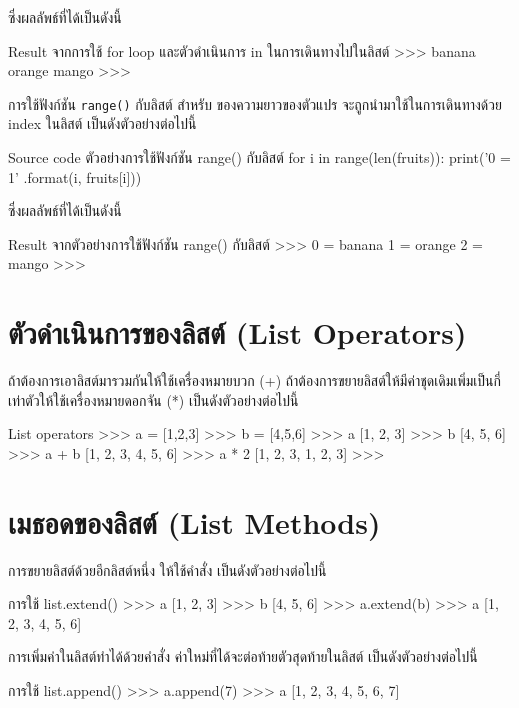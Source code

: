 ซึ่งผลลัพธ์ที่ได้เป็นดังนี้

\begin{codelist}{Result จากการใช้ for loop และตัวดำเนินการ in ในการเดินทางไปในลิสต์}{}
>>>
banana
orange
mango
>>>
\end{codelist}

การใช้ฟังก์ชัน  \texttt{range()} กับลิสต์ สำหรับ   ของความยาวของตัวแปร จะถูกนำมาใช้ในการเดินทางด้วย index ในลิสต์ เป็นดังตัวอย่างต่อไปนี้

\begin{codelist}{Source code ตัวอย่างการใช้ฟังก์ชัน range() กับลิสต์}{}
for i in range(len(fruits)):
    print('{0} = {1}' .format(i, fruits[i]))
\end{codelist}

ซึ่งผลลัพธ์ที่ได้เป็นดังนี้

\begin{codelist}{Result จากตัวอย่างการใช้ฟังก์ชัน range() กับลิสต์}{}
>>>
0 = banana
1 = orange
2 = mango
>>>
\end{codelist}

\section{ตัวดำเนินการของลิสต์ (List Operators)}

ถ้าต้องการเอาลิสต์มารวมกันให้ใช้เครื่องหมายบวก (+) ถ้าต้องการขยายลิสต์ให้มีค่าชุดเดิมเพิ่มเป็นกี่เท่าตัวให้ใช้เครื่องหมายดอกจัน (*) เป็นดังตัวอย่างต่อไปนี้

\begin{codelist}{List operators}{}
>>> a = [1,2,3]
>>> b = [4,5,6]
>>> a
[1, 2, 3]
>>> b
[4, 5, 6]
>>> a + b
[1, 2, 3, 4, 5, 6]
>>> a * 2
[1, 2, 3, 1, 2, 3]
>>>
\end{codelist}


\section{เมธอดของลิสต์ (List Methods)}

การขยายลิสต์ด้วยอีกลิสต์หนึ่ง ให้ใช้คำสั่ง   เป็นดังตัวอย่างต่อไปนี้
\begin{codelist}{การใช้ list.extend()}{}
>>> a
[1, 2, 3]
>>> b
[4, 5, 6]
>>> a.extend(b)
>>> a
[1, 2, 3, 4, 5, 6]
\end{codelist}

การเพิ่มค่าในลิสต์ทำได้ด้วยคำสั่ง   ค่าใหม่ที่ได้จะต่อท้ายตัวสุดท้ายในลิสต์ เป็นดังตัวอย่างต่อไปนี้
\begin{codelist}{การใช้ list.append()}{}
>>> a.append(7)
>>> a
[1, 2, 3, 4, 5, 6, 7]
\end{codelist}


